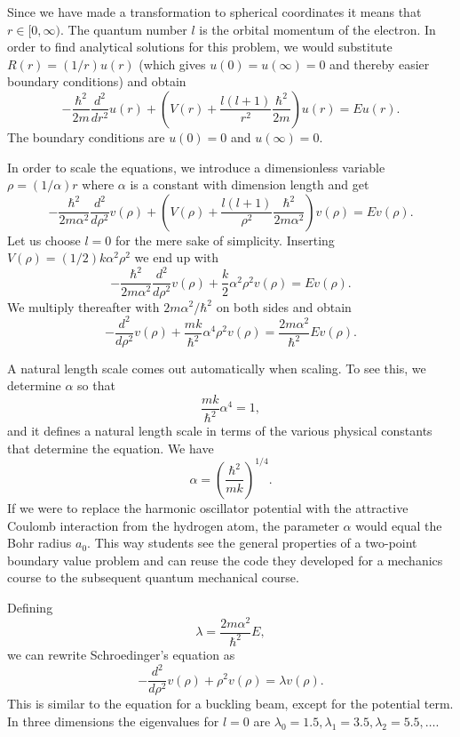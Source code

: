 \documentclass[graybox,envcountchap,sectrefs]{svmult}
\begin{document}
Since we have made a transformation to spherical coordinates it means
that $r\in [0,\infty)$. The quantum number $l$ is the orbital momentum
  of the electron.  In order to find analytical solutions for this
  problem, we would substitute $R(r) = (1/r) u(r)$ (which gives
  $u(0)=u(\infty)=0$ and thereby easier boundary conditions) and
  obtain
\[
  -\frac{\hbar^2}{2 m} \frac{d^2}{dr^2} u(r)
       + \left ( V(r) + \frac{l (l + 1)}{r^2}\frac{\hbar^2}{2 m}
                                    \right ) u(r)  = E u(r) .
\]
The boundary conditions are $u(0)=0$ and $u(\infty)=0$.

In order to scale the equations, we introduce a dimensionless variable $\rho = (1/\alpha) r$
where $\alpha$ is a constant with dimension length and get
\[
  -\frac{\hbar^2}{2 m \alpha^2} \frac{d^2}{d\rho^2} v(\rho)
       + \left ( V(\rho) + \frac{l (l + 1)}{\rho^2}
         \frac{\hbar^2}{2 m\alpha^2} \right ) v(\rho)  = E v(\rho) .
\]
Let us choose $l=0$ for the mere sake of simplicity.
Inserting $V(\rho) = (1/2) k \alpha^2\rho^2$ we end up with
\[
  -\frac{\hbar^2}{2 m \alpha^2} \frac{d^2}{d\rho^2} v(\rho)
       + \frac{k}{2} \alpha^2\rho^2v(\rho)  = E v(\rho).
\]
We multiply thereafter with $2m\alpha^2/\hbar^2$ on both sides and obtain
\[
  -\frac{d^2}{d\rho^2} v(\rho)
       + \frac{mk}{\hbar^2} \alpha^4\rho^2v(\rho)  = \frac{2m\alpha^2}{\hbar^2}E v(\rho) .
\]

A natural length scale comes out automatically when scaling. To see this,
we determine $\alpha$  so that
\[
\frac{mk}{\hbar^2} \alpha^4 = 1,
\]
and it defines a natural length scale in terms of the various physical
constants that determine the equation.  We have
\[
\alpha = \left(\frac{\hbar^2}{mk}\right)^{1/4}.
\]
If we were to replace the harmonic oscillator potential with the
attractive Coulomb interaction from the hydrogen atom, the  parameter $\alpha$ would equal the Bohr
radius $a_0$.  This way students see the general properties of a
two-point boundary value problem and can reuse the code they developed
for a mechanics course to the subsequent quantum mechanical course.

Defining
\[
\lambda = \frac{2m\alpha^2}{\hbar^2}E,
\]
we can rewrite Schroedinger's equation as
\[
  -\frac{d^2}{d\rho^2} v(\rho) + \rho^2v(\rho)  = \lambda v(\rho) .
\]
This is similar to the equation for a buckling beam, except for the
potential term.  In three dimensions the eigenvalues for $l=0$ are
$\lambda_0=1.5,\lambda_1=3.5,\lambda_2=5.5,\dots .$
\end{document}

